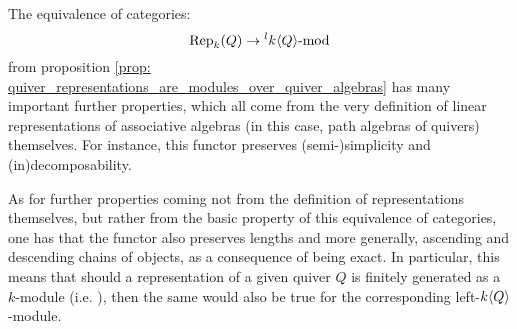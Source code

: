             \begin{remark}
                The equivalence of categories:
                    $$\mathrm{Rep}_{k}(Q) \to {}^lk\langle Q\rangle\text{-}\mathrm{mod}$$
                from proposition \ref{prop: quiver_representations_are_modules_over_quiver_algebras} has many important further properties, which all come from the very definition of linear representations of associative algebras (in this case, path algebras of quivers) themselves. For instance, this functor preserves (semi-)simplicity and (in)decomposability.
                
                As for further properties coming not from the definition of representations themselves, but rather from the basic property of this equivalence of categories, one has that the functor also preserves lengths and more generally, ascending and descending chains of objects, as a consequence of being exact. In particular, this means that should a representation of a given quiver $Q$ is finitely generated as a $k$-module (i.e. ), then the same would also be true for the corresponding left-$k\langle Q\rangle$-module.
            \end{remark}
                

